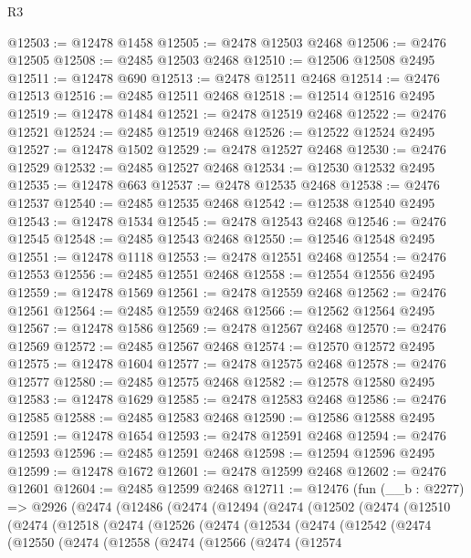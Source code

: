 \begin{lexlean}{R3}
\begin{coremodule}
@12503 := @12478 @1458
@12505 := @2478 @12503 @2468
@12506 := @2476 @12505
@12508 := @2485 @12503 @2468
@12510 := @12506 @12508 @2495
@12511 := @12478 @690
@12513 := @2478 @12511 @2468
@12514 := @2476 @12513
@12516 := @2485 @12511 @2468
@12518 := @12514 @12516 @2495
@12519 := @12478 @1484
@12521 := @2478 @12519 @2468
@12522 := @2476 @12521
@12524 := @2485 @12519 @2468
@12526 := @12522 @12524 @2495
@12527 := @12478 @1502
@12529 := @2478 @12527 @2468
@12530 := @2476 @12529
@12532 := @2485 @12527 @2468
@12534 := @12530 @12532 @2495
@12535 := @12478 @663
@12537 := @2478 @12535 @2468
@12538 := @2476 @12537
@12540 := @2485 @12535 @2468
@12542 := @12538 @12540 @2495
@12543 := @12478 @1534
@12545 := @2478 @12543 @2468
@12546 := @2476 @12545
@12548 := @2485 @12543 @2468
@12550 := @12546 @12548 @2495
@12551 := @12478 @1118
@12553 := @2478 @12551 @2468
@12554 := @2476 @12553
@12556 := @2485 @12551 @2468
@12558 := @12554 @12556 @2495
@12559 := @12478 @1569
@12561 := @2478 @12559 @2468
@12562 := @2476 @12561
@12564 := @2485 @12559 @2468
@12566 := @12562 @12564 @2495
@12567 := @12478 @1586
@12569 := @2478 @12567 @2468
@12570 := @2476 @12569
@12572 := @2485 @12567 @2468
@12574 := @12570 @12572 @2495
@12575 := @12478 @1604
@12577 := @2478 @12575 @2468
@12578 := @2476 @12577
@12580 := @2485 @12575 @2468
@12582 := @12578 @12580 @2495
@12583 := @12478 @1629
@12585 := @2478 @12583 @2468
@12586 := @2476 @12585
@12588 := @2485 @12583 @2468
@12590 := @12586 @12588 @2495
@12591 := @12478 @1654
@12593 := @2478 @12591 @2468
@12594 := @2476 @12593
@12596 := @2485 @12591 @2468
@12598 := @12594 @12596 @2495
@12599 := @12478 @1672
@12601 := @2478 @12599 @2468
@12602 := @2476 @12601
@12604 := @2485 @12599 @2468
@12711 := @12476
    (fun (__b : @2277) =>
    @2926
      (@2474
        (@12486
          (@2474
            (@12494
              (@2474
                (@12502
                  (@2474
                    (@12510
                      (@2474
                        (@12518
                          (@2474
                            (@12526
                              (@2474
                                (@12534
                                  (@2474
                                    (@12542
                                      (@2474
                                        (@12550
                                          (@2474
                                            (@12558
                                              (@2474
                                                (@12566
                                                  (@2474
                                                    (@12574

\end{coremodule}
\end{lexlean}
